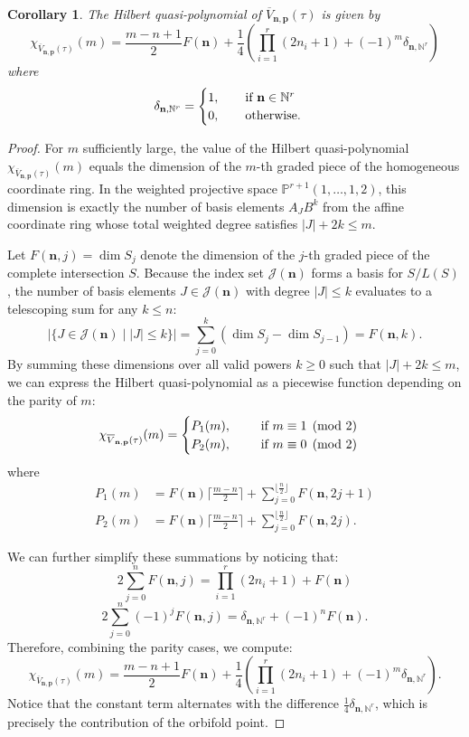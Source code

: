 \documentclass[11pt]{amsart}
\newtheorem{corollary}[theorem]{Corollary}
\theoremstyle{remark}
\numberwithin{equation}{section}
\begin{document}
\begin{corollary}
The Hilbert quasi-polynomial of $\overline{V}_{\mathbf{n},\mathbf{p}}(\tau)$ is given by
\[
\chi_{\overline{V}_{\mathbf{n},\mathbf{p}}(\tau)}(m)=\frac{m-n+1}{2}F(\mathbf{n})+\frac{1}{4}\left( \prod_{i=1}^r (2n_i+1)+(-1)^m\delta_{\mathbf{n},\mathbb{N}^r}\right)
\]
where
\[
\delta_{\mathbf{n},\mathbb{N}^r} = 
\begin{cases}
    1,\qquad\textnormal{if } \mathbf{n} \in \mathbb{N}^r
    \\
    0,\qquad\textnormal{otherwise.} 
\end{cases}
\]
\end{corollary}
\begin{proof}
For $m$ sufficiently large, the value of the Hilbert quasi-polynomial $\chi_{\overline{V}_{\mathbf{n},\mathbf{p}}(\tau)}(m)$ equals the dimension of the $m$-th graded piece of the homogeneous coordinate ring. In the weighted projective space $\mathbb{P}^{r+1}(1,\dots,1,2)$, this dimension is exactly the number of basis elements $A_J B^k$ from the affine coordinate ring whose total weighted degree satisfies $|J| + 2k \le m$.

Let $F(\mathbf{n}, j) = \dim S_j$ denote the dimension of the $j$-th graded piece of the complete intersection $S$. Because the index set $\mathcal{J}(\mathbf{n})$ forms a basis for $S/L(S)$, the number of basis elements $J \in \mathcal{J}(\mathbf{n})$ with degree $|J| \le k$ evaluates to a telescoping sum for any $k \le n$:
\[
    |\{ J \in \mathcal{J}(\mathbf{n}) \mid |J| \le k \}| = \sum_{j=0}^k (\dim S_j - \dim S_{j-1}) = F(\mathbf{n}, k).
\]
By summing these dimensions over all valid powers $k \ge 0$ such that $|J| + 2k \le m$, we can express the Hilbert quasi-polynomial as a piecewise function depending on the parity of $m$: 
\[
\chi_{\overline{V}_{\mathbf{n},\mathbf{p}}(\tau)}(m)=
\begin{cases}
    P_1(m), \qquad\textnormal{ if } m\equiv 1 \pmod 2\\
    P_2(m), \qquad\textnormal{ if } m\equiv 0 \pmod 2
\end{cases}
\]
where
\begin{align*}
    P_1(m)&=F(\mathbf{n})\lceil \frac{m-n}{2}\rceil+\sum_{j=0}^{\lfloor\frac{n}{2}\rfloor}F(\mathbf{n},2j+1)\\
    P_2(m)&=F(\mathbf{n})\lceil \frac{m-n}{2}\rceil+\sum_{j=0}^{\lfloor\frac{n}{2}\rfloor}F(\mathbf{n},2j).
\end{align*}

We can further simplify these summations by noticing that:
\[
    2\sum_{j=0}^n F(\mathbf{n},j)= \prod_{i=1}^r (2n_i+1)+F(\mathbf{n})
\]
\[
    2\sum_{j=0}^{n}(-1)^j F(\mathbf{n},j)= \delta_{\mathbf{n},\mathbb{N}^r} +(-1)^nF(\mathbf{n}).
\]
Therefore, combining the parity cases, we compute:
\[
    \chi_{\overline{V}_{\mathbf{n},\mathbf{p}}(\tau)}(m)=\frac{m-n+1}{2}F(\mathbf{n})+\frac{1}{4}\left( \prod_{i=1}^r (2n_i+1)+(-1)^m\delta_{\mathbf{n},\mathbb{N}^r}\right).
\]
Notice that the constant term alternates with the difference $\frac{1}{4}\delta_{\mathbf{n},\mathbb{N}^r}$, which is precisely the contribution of the orbifold point.
\end{proof}
\end{document}
